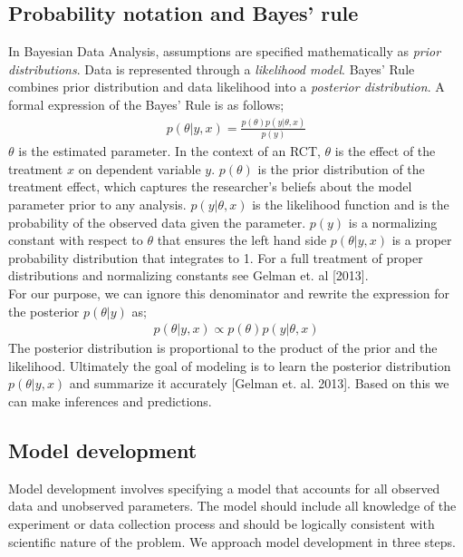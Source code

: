 \documentclass{article}
\begin{document}
\subsection{Probability notation and Bayes' rule}
In Bayesian Data Analysis, assumptions are specified mathematically as \textit{prior distributions}.  Data is represented through a \textit{likelihood model}. Bayes' Rule combines prior distribution and data likelihood into a \textit{posterior distribution}.  A formal expression of the Bayes' Rule is as follows;
\begin{align}
{p(\theta| y, x) = \frac{ p(\theta) p(y|\theta, x)}{p(y)}}
\end{align}
$\theta$ is the estimated parameter. In the context of an RCT, $\theta$ is the effect of the treatment $x$ on dependent variable $y$. $p(\theta)$ is the prior distribution of the treatment effect, which captures the researcher's beliefs about the model parameter prior to any analysis. $p(y | \theta, x)$ is the likelihood function and is the probability of the observed data given the parameter.  $p(y)$ is a normalizing constant with respect to $\theta$ that ensures the left hand side $p(\theta |y, x)$ is a proper probability distribution that integrates to 1. For a full treatment of proper distributions and normalizing constants see Gelman et. al [2013]. \\
For our purpose, we can ignore this denominator and rewrite the expression for the posterior $p(\theta | y)$ as;
 \begin{align}
 p(\theta | y, x) \propto p(\theta) p(y |\theta, x)
 \end{align}
The posterior distribution is proportional to the product of the prior and the likelihood. Ultimately the goal of modeling is to learn the posterior distribution $p(\theta|y, x)$ and summarize it accurately [Gelman et. al. 2013]. Based on this we can make inferences and predictions.

\subsection{Model development}
Model development involves specifying a model that accounts for all observed data and unobserved parameters. The model should include all knowledge of the experiment or data collection process and should be logically consistent with scientific nature of the problem. We approach model development in three steps.
\end{document}
